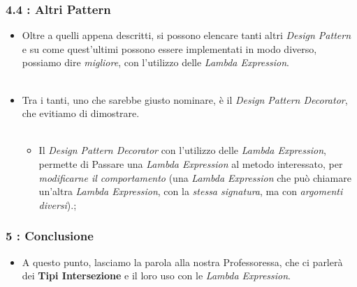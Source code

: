 \documentclass{beamer}
\begin{document}

\begin{frame}
	\frametitle{\textbf{4.4 : Altri Pattern}}
	\begin{itemize}
		\item
			Oltre a quelli appena descritti, si possono elencare tanti altri \textit{Design Pattern} e su come quest'ultimi possono essere implementati in modo diverso, possiamo dire \textit{migliore}, con l'utilizzo delle \textit{Lambda Expression}.\\\
		\item
			Tra i tanti, uno che sarebbe giusto nominare, è il \textit{Design Pattern Decorator}, che evitiamo di dimostrare.\\\
			\begin{itemize}
				\item
					Il \textit{Design Pattern Decorator} con l'utilizzo delle \textit{Lambda Expression}, permette di Passare una \textit{Lambda Expression} al metodo interessato, per \textit{modificarne il comportamento} (una \textit{Lambda Expression} che può chiamare un'altra \textit{Lambda Expression}, con la \textit{stessa signatura}, ma con \textit{argomenti diversi}).;
			\end{itemize}
	\end{itemize}
\end{frame}


\begin{frame}
	\frametitle{\textbf{5 : Conclusione}}
	\begin{itemize}
		\item
			A questo punto, lasciamo la parola alla nostra Professoressa, che ci parlerà dei \textbf{Tipi Intersezione} e il loro uso con le \textit{Lambda Expression}.
	\end{itemize}
\end{frame}

\end{document}
